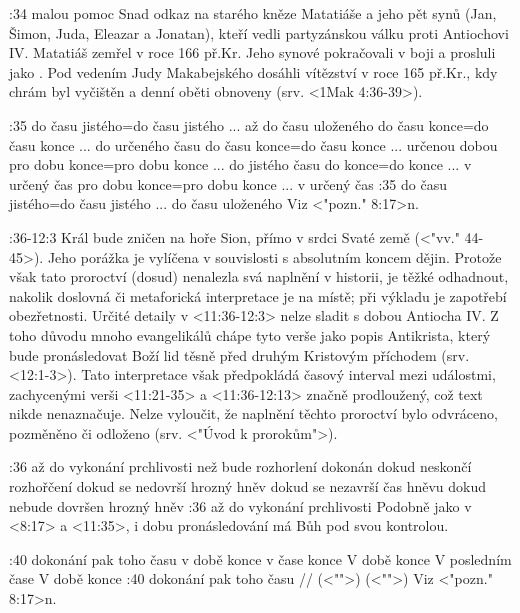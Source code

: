 :34 {malou pomoc}  Snad odkaz na starého kněze Matatiáše a jeho pět synů (Jan, Šimon, Juda, Eleazar a Jonatan), kteří vedli partyzánskou válku proti Antiochovi IV. Matatiáš zemřel v roce 166 př.Kr. Jeho synové pokračovali v boji a prosluli jako . Pod vedením Judy Makabejského dosáhli vítězství v roce 165 př.Kr., kdy chrám byl vyčištěn a denní oběti obnoveny (srv. <1Mak 4:36-39>).

:35
    {do času jistého}={do času jistého ... až do času uloženého}   %
    {do času konce}={do času konce ... do určeného času}   %
    {do času konce}={do času konce ... určenou dobou}   %
    {pro dobu konce}={pro dobu konce ... do jistého času}   %
    {do konce}={do konce ... v určený čas}   %
    {pro dobu konce}={pro dobu konce ... v určený čas}   %
:35 {do času jistého}={do času jistého ... do času uloženého}  
    Viz <"pozn." 8:17>n.
    

:36-12:3 {}
    Král bude zničen na hoře Sion, přímo v srdci Svaté země (<"vv." 44-45>).  
    Jeho porážka je vylíčena v souvislosti s absolutním koncem dějin.
    Protože však tato proroctví (dosud)  nenalezla svá naplnění v historii, je těžké odhadnout, nakolik doslovná či metaforická interpretace je na místě; při  výkladu je zapotřebí obezřetnosti. 
    Určité detaily v <11:36-12:3> nelze sladit s dobou Antiocha IV.
    Z toho důvodu mnoho evangelikálů chápe tyto verše jako popis Antikrista, který bude pronásledovat Boží lid těsně před druhým Kristovým příchodem (srv. <12:1-3>). Tato interpretace však předpokládá  časový interval mezi událostmi, zachycenými  verši <11:21-35> a  <11:36-12:13> značně prodloužený, což  text nikde nenaznačuje.
    Nelze vyloučit, že naplnění těchto proroctví bylo odvráceno,  pozměněno či odloženo (srv. <"Úvod k prorokům">).
    
    

:36
    {až do vykonání prchlivosti}   %
    {než bude rozhorlení dokonán}   %
    {dokud neskončí rozhořčení}   %
    {dokud se nedovrší hrozný hněv}   %
    {dokud se nezavrší čas hněvu}  %
    {dokud nebude dovršen hrozný hněv}   %
:36 {až do vykonání prchlivosti}  
    Podobně jako v <8:17> a <11:35>, i dobu pronásledování má Bůh pod svou kontrolou.


:40
    {dokonání pak toho času}   %
    {v době konce}   %
    {v čase konce}   %
    {V době konce}   %
    {V posledním čase}   %
    {V době konce}   %
:40 {dokonání pak toho času}  \x// (<"">) (<"">) 
    Viz <"pozn." 8:17>n.

